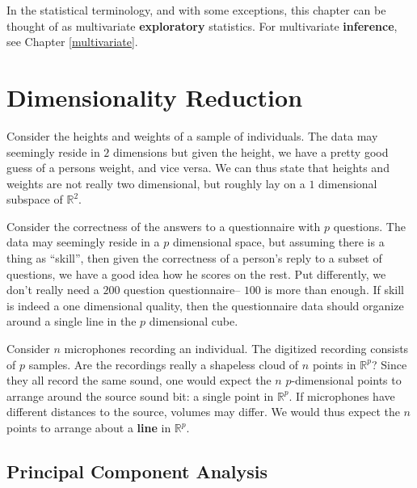 \documentclass[]{book}
\theoremstyle{definition}
\theoremstyle{definition}
\theoremstyle{definition}
\theoremstyle{remark}
\let\BeginKnitrBlock\begin \let\EndKnitrBlock\end
\begin{document}
In the statistical terminology, and with some exceptions, this chapter
can be thought of as multivariate \textbf{exploratory} statistics. For
multivariate \textbf{inference}, see Chapter \ref{multivariate}.

\section{Dimensionality Reduction}\label{dim-reduce}

\BeginKnitrBlock{example}
\protect\hypertarget{exm:bmi}{}{\label{exm:bmi} }Consider the heights and
weights of a sample of individuals. The data may seemingly reside in
\(2\) dimensions but given the height, we have a pretty good guess of a
persons weight, and vice versa. We can thus state that heights and
weights are not really two dimensional, but roughly lay on a \(1\)
dimensional subspace of \(\mathbb{R}^2\).
\EndKnitrBlock{example}

\BeginKnitrBlock{example}
\protect\hypertarget{exm:iq}{}{\label{exm:iq} }Consider the correctness of
the answers to a questionnaire with \(p\) questions. The data may
seemingly reside in a \(p\) dimensional space, but assuming there is a
thing as ``skill'', then given the correctness of a person's reply to a
subset of questions, we have a good idea how he scores on the rest. Put
differently, we don't really need a \(200\) question questionnaire--
\(100\) is more than enough. If skill is indeed a one dimensional
quality, then the questionnaire data should organize around a single
line in the \(p\) dimensional cube.
\EndKnitrBlock{example}

\BeginKnitrBlock{example}
\protect\hypertarget{exm:blind-signal}{}{\label{exm:blind-signal} }Consider
\(n\) microphones recording an individual. The digitized recording
consists of \(p\) samples. Are the recordings really a shapeless cloud
of \(n\) points in \(\mathbb{R}^p\)? Since they all record the same
sound, one would expect the \(n\) \(p\)-dimensional points to arrange
around the source sound bit: a single point in \(\mathbb{R}^p\). If
microphones have different distances to the source, volumes may differ.
We would thus expect the \(n\) points to arrange about a \textbf{line}
in \(\mathbb{R}^p\).
\EndKnitrBlock{example}

\subsection{Principal Component Analysis}\label{pca}
\end{document}
